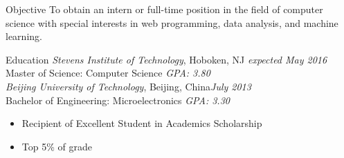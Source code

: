 \documentclass{resume} 		%
\begin{document}

\begin{rSection}{Objective}
To obtain an intern or full-time position in the field of computer science with special interests in web programming, data analysis, and machine learning.
\end{rSection}


\begin{rSection}{Education}
{\sl Stevens Institute of Technology}, Hoboken, NJ \hfill {\em expected May 2016} \\ 	%
Master of Science: Computer Science {\em GPA: 3.80}\\
{\sl Beijing University of Technology}, Beijing, China\hfill {\em July 2013} \\ 
Bachelor of Engineering: Microelectronics	   {\em GPA: 3.30 }
\begin{itemize} 
 \setlength\itemsep{-0.5em}		%
 \renewcommand\labelitemi{--}		%
\item Recipient of Excellent Student in Academics Scholarship
\item Top 5\% of grade
\end{itemize} 
\end{rSection}

\end{document}
